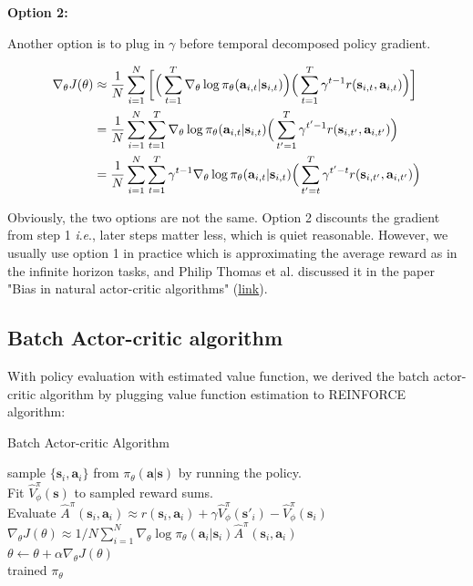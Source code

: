\documentclass{tufte-handout}
\newcommand{\ie}{\textit{i}.\textit{e}., }
\newcommand{\s}{\mathbf{s}}
\newcommand{\act}{\mathbf{a}}
\begin{document}
\textbf{Option 2:}

Another option is to plug in $\gamma$ before temporal decomposed policy gradient.

\begin{align}
\label{eq:21}
\nabla _\theta J(\theta)
& \approx \frac{1}{N} \sum_{i=1} ^ {N} \bigg[\Big(\sum_{t=1}^T \nabla_\theta \log \pi_\theta(\act_{i,t} | \s_{i,t}) \Big)
\Big( \sum_{t=1}^T \gamma^{t - 1} r(\s_{i,t}, \act_{i,t}) \Big) \bigg] \notag \\
& = \frac{1}{N} \sum_{i=1} ^ {N} \sum_{t=1}^T \nabla_\theta \log \pi_\theta(\act_{i,t} | \s_{i,t})
\Big( \sum_{t'=1}^T \gamma^{t' - 1} r(\s_{i,t'}, \act_{i,t'}) \Big)  \notag \\
& = \frac{1}{N} \sum_{i=1} ^ {N} \sum_{t=1}^T \gamma ^ {t - 1} \nabla_\theta \log \pi_\theta(\act_{i,t} | \s_{i,t})
\Big( \sum_{t'=t}^T \gamma^{t' - t} r(\s_{i,t'}, \act_{i,t'}) \Big)
\end{align}

Obviously, the two options are not the same. Option 2 discounts the gradient from step 1 \ie later steps matter less, which is quiet reasonable.
However, we usually use option 1 in practice which is approximating the average reward as in the infinite horizon tasks, and Philip Thomas et al.
discussed it in the paper "Bias in natural actor-critic algorithms" (\href{http://proceedings.mlr.press/v32/thomas14.html}{link}).

\subsection{Batch Actor-critic algorithm}

With policy evaluation with estimated value function, we derived the batch actor-critic algorithm by plugging value function estimation to REINFORCE algorithm:

\begin{algorithm}
  \caption{Batch Actor-critic Algorithm}
    \label{algo:batch-ac}
    \begin{algorithmic}[1]
    \STATE sample $\{\s_i, \act_i \} $ from $\pi_\theta(\act | \s)$ by running the policy. \\
    \STATE Fit $\hat{V}_\phi ^ \pi (\s)$ to sampled reward sums. \\
    \STATE Evaluate $\hat{A}^\pi(\s_i, \act_i) \approx r(\s_i, \act_i) + \gamma \hat{V}^\pi_\phi (\s'_{i}) - \hat{V}^\pi_\phi(\s_{i})$
    \STATE $\nabla _\theta J(\theta) \approx 1/N \sum_{i=1} ^ {N} \nabla_\theta \log \pi_\theta(\act_i| \s_i) \hat{A}^\pi(\s_i, \act_i)$ \\
    \STATE $ \theta \leftarrow \theta + \alpha \nabla _\theta J(\theta)$ \\
    \ENDWHILE
    \RETURN trained $\pi_\theta$  %
  \end{algorithmic}
\end{algorithm}
\end{document}
